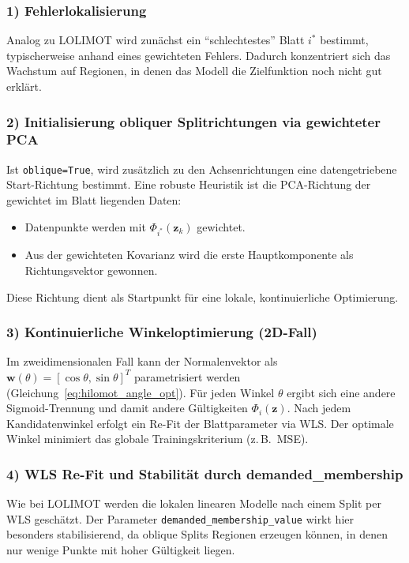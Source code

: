 \documentclass[11pt,a4paper]{report}
\begin{document}
\subsubsection{1) Fehlerlokalisierung}
Analog zu LOLIMOT wird zun\"{a}chst ein ``schlechtestes'' Blatt $i^*$ bestimmt, typischerweise
anhand eines gewichteten Fehlers. Dadurch konzentriert sich das Wachstum auf Regionen, in
denen das Modell die Zielfunktion noch nicht gut erkl\"{a}rt.

\subsubsection{2) Initialisierung obliquer Splitrichtungen via gewichteter PCA}
Ist \texttt{oblique=True}, wird zus\"{a}tzlich zu den Achsenrichtungen eine datengetriebene
Start-Richtung bestimmt. Eine robuste Heuristik ist die PCA-Richtung der gewichtet im
Blatt liegenden Daten:
\begin{itemize}
\item Datenpunkte werden mit $\Phi_{i^*}(\mathbf{z}_k)$ gewichtet.
\item Aus der gewichteten Kovarianz wird die erste Hauptkomponente als Richtungsvektor
      gewonnen.
\end{itemize}
Diese Richtung dient als Startpunkt f\"{u}r eine lokale, kontinuierliche Optimierung.

\subsubsection{3) Kontinuierliche Winkeloptimierung (2D-Fall)}
Im zweidimensionalen Fall kann der Normalenvektor als
$\mathbf{w}(\theta)=[\cos\theta,\sin\theta]^T$ parametrisiert werden
(Gleichung~\ref{eq:hilomot_angle_opt}). F\"{u}r jeden Winkel $\theta$ ergibt sich eine andere
Sigmoid-Trennung und damit andere G\"{u}ltigkeiten $\Phi_i(\mathbf{z})$. Nach jedem
Kandidatenwinkel erfolgt ein Re-Fit der Blattparameter via WLS. Der optimale Winkel
minimiert das globale Trainingskriterium (z.\,B.\ MSE).

\subsubsection{4) WLS Re-Fit und Stabilit\"{a}t durch demanded\_membership}
Wie bei LOLIMOT werden die lokalen linearen Modelle nach einem Split per WLS gesch\"{a}tzt.
Der Parameter \texttt{demanded\_membership\_value} wirkt hier besonders stabilisierend,
da oblique Splits Regionen erzeugen k\"{o}nnen, in denen nur wenige Punkte mit hoher
G\"{u}ltigkeit liegen.
\end{document}
